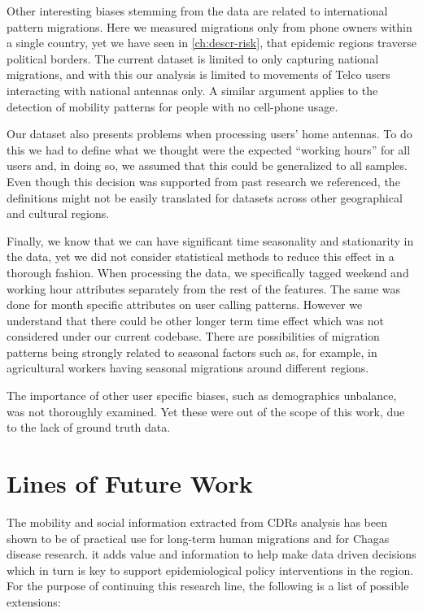 Other interesting biases stemming from the data are related to international pattern migrations.
Here we measured migrations only from phone owners within a single country, yet we have seen in \cref{ch:descr-risk}, that  epidemic regions traverse political borders.
The current dataset is limited to only capturing national migrations, and with this our analysis is limited to movements of Telco users interacting with national antennas only.
A similar argument applies to the detection of mobility patterns for people with no cell-phone usage.

Our dataset also presents problems when processing users' home antennas.
To do this we had to define what we thought were the expected ``working hours'' for all users and, in doing so, we assumed that this could be generalized to all samples. %
Even though this decision was supported from past research we referenced, the definitions might not be easily translated for datasets across other geographical and cultural regions.


Finally, we know that we can have significant time seasonality and stationarity in the data, yet we did not consider statistical methods to reduce this effect in a thorough fashion. %
When processing the data, we specifically tagged weekend and working hour attributes separately from the rest of the features.
The same was done for month specific attributes on user calling patterns.
However we understand that there could be other longer term time effect which was not considered under our current codebase. %
There are possibilities of migration patterns being strongly related to seasonal factors such as, for example, in agricultural workers having seasonal migrations around different regions.%

The importance of other user specific biases, such as demographics unbalance, was not thoroughly examined.
Yet these were out of the scope of this work, due to the lack of ground truth data. 


\section{ Lines of Future Work }


The mobility and social information extracted from CDRs analysis has been shown to be of practical use for long-term human migrations and for Chagas disease research.
it adds value and information to help make data driven decisions which in turn is key to support epidemiological policy interventions in the region.
For the purpose of continuing this research line, the following is a list of possible extensions:

